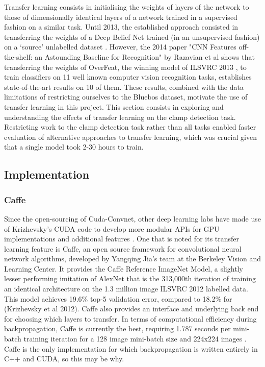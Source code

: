 \documentclass[a4paper,11pt]{article}
\begin{document}
Transfer learning consists in initialising the weights of layers of the network to those of dimensionally identical layers of a network trained in a supervised fashion on a similar task. Until 2013, the established approach consisted in transferring the weights of a Deep Belief Net trained (in an unsupervised fashion) on a `source' unlabelled dataset \cite{microsoft-book}. However, the 2014 paper "CNN Features off-the-shelf: an Astounding Baseline for Recognition" by Razavian et al shows that transferring the weights of OverFeat, the winning model of ILSVRC 2013 \cite{transfer-learning}, to train classifiers on 11 well known computer vision recognition tasks, establishes state-of-the-art results on 10 of them\cite{off-the-shelf}. These results, combined with the data limitations of restricting ourselves to the Bluebos dataset, motivate the use of transfer learning in this project. This section consists in exploring and understanding the effects of transfer learning on the clamp detection task. Restricting work to the clamp detection task rather than all tasks enabled faster evaluation of alternative approaches to transfer learning, which was crucial given that a single model took 2-30 hours to train. 


\subsection{Implementation}

\subsubsection{Caffe}

Since the open-sourcing of Cuda-Convnet, other deep learning labs have made use of Krizhevsky's CUDA code to develop more modular APIs for GPU implementations and additional features \cite{caffe} \cite{theano} \cite{torch7}. One that is noted for its transfer learning feature is Caffe, an open source framework for convolutional neural network algorithms, developed by Yangqing Jia's team at the Berkeley Vision and Learning Center. It provides the Caffe Reference ImageNet Model, a slightly lesser performing imitation of AlexNet \cite{decaf} that is the 313,000th iteration of training an identical architecture on the 1.3 million image ILSVRC 2012 labelled data. This model achieves 19.6\% top-5 validation error, compared to 18.2\% for (Krizhevsky et al 2012). Caffe also provides an interface and underlying back end for choosing which layers to transfer. In terms of computational efficiency during backpropagation, Caffe is currently the best, requiring 1.787 seconds per mini-batch training iteration for a 128 image mini-batch size and 224x224 images \cite{soumith-benchmark}. Caffe is the only implementation for which backpropagation is written entirely in C++ and CUDA, so this may be why. 
\end{document}
